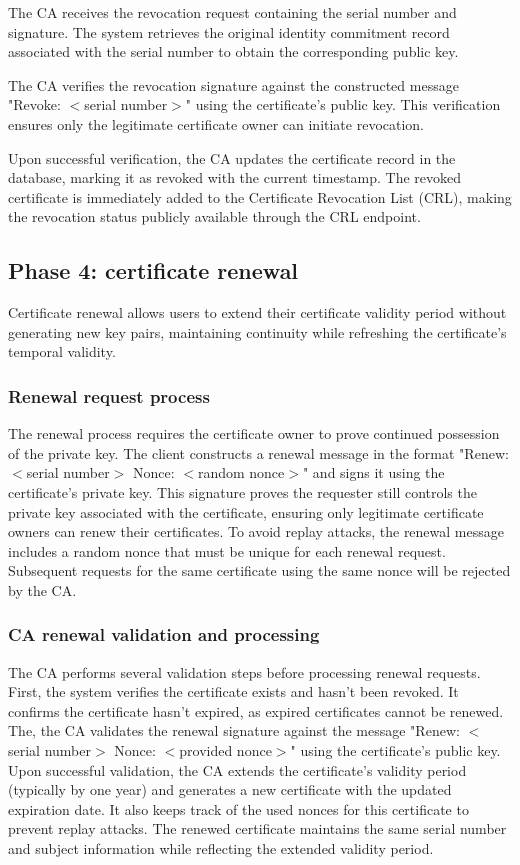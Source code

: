 The CA receives the revocation request containing the serial number and signature. 
The system retrieves the original identity commitment record associated with 
the serial number to obtain the corresponding public key.

The CA verifies the revocation signature against the constructed message 
"Revoke: $<$serial number$>$" using the certificate's public key. This verification 
ensures only the legitimate certificate owner can initiate revocation.

Upon successful verification, the CA updates the certificate record in the database, 
marking it as revoked with the current timestamp. The revoked certificate is 
immediately added to the Certificate Revocation List (CRL), making the revocation 
status publicly available through the CRL endpoint.

\subsection{Phase 4: certificate renewal}

Certificate renewal allows users to extend their certificate validity period 
without generating new key pairs, maintaining continuity while refreshing 
the certificate's temporal validity.

\subsubsection{Renewal request process}
The renewal process requires the certificate owner to prove continued possession 
of the private key. The client constructs a renewal message in the format 
"Renew: $<$serial number$>$ Nonce: $<$random nonce$>$" and signs it using the certificate's 
private key.
This signature proves the requester still controls the private key associated 
with the certificate, ensuring only legitimate certificate owners can renew 
their certificates. To avoid replay attacks, the renewal message includes a 
random nonce that must be unique for each renewal request. Subsequent requests 
for the same certificate using the same nonce will be rejected by the CA.

\subsubsection{CA renewal validation and processing}

The CA performs several validation steps before processing renewal requests.
First, the system verifies the certificate exists and hasn't been revoked. It confirms 
the certificate hasn't expired, as expired certificates cannot be renewed. 
The, the CA validates the renewal signature against the message "Renew: $<$serial number$>$ Nonce: 
$<$provided nonce$>$" using the certificate's public key.
Upon successful validation, the CA extends the certificate's validity period 
(typically by one year) and generates a new certificate with the updated expiration 
date. It also keeps track of the used nonces for this certificate to prevent 
replay attacks.
The renewed certificate maintains the same serial number and subject 
information while reflecting the extended validity period.

